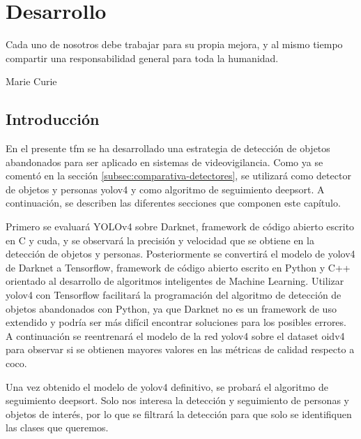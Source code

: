 
\chapter{Desarrollo}
\label{cha:desarrollo}

\begin{FraseCelebre}
  \begin{Frase}
    Cada uno de nosotros debe trabajar para su propia mejora, y al mismo tiempo compartir una responsabilidad general para toda la humanidad.
  \end{Frase}
  \begin{Fuente}
    Marie Curie
  \end{Fuente}
\end{FraseCelebre}

\section{Introducción}
\label{sec:intro-desarrollo}

En el presente \gls{tfm} se ha desarrollado una estrategia de detección de objetos abandonados para ser aplicado en sistemas de videovigilancia. Como ya se comentó en la sección \ref{subsec:comparativa-detectores}, se utilizará como detector de objetos y personas \gls{yolov4} y como algoritmo de seguimiento \gls{deepsort}. A continuación, se describen las diferentes secciones que componen este capítulo.

Primero se evaluará YOLOv4 sobre Darknet, framework de código abierto escrito en C y \gls{cuda}, y se observará la precisión y velocidad que se obtiene en la detección de objetos y personas. Posteriormente se convertirá el modelo de \gls{yolov4} de Darknet a Tensorflow, framework de código abierto escrito en Python y C++ orientado al desarrollo de algoritmos inteligentes de Machine Learning. Utilizar \gls{yolov4} con Tensorflow facilitará la programación del algoritmo de detección de objetos abandonados con Python, ya que Darknet no es un framework de uso extendido y podría ser más difícil encontrar soluciones para los posibles errores. A continuación se reentrenará el modelo de la red \gls{yolov4} sobre el dataset \gls{oidv4} para observar si se obtienen mayores valores en las métricas de calidad respecto a \gls{coco}.

Una vez obtenido el modelo de \gls{yolov4} definitivo, se probará el algoritmo de seguimiento \gls{deepsort}. Solo nos interesa la detección y seguimiento de personas y objetos de interés, por lo que se filtrará la detección para que solo se identifiquen las clases que queremos.

